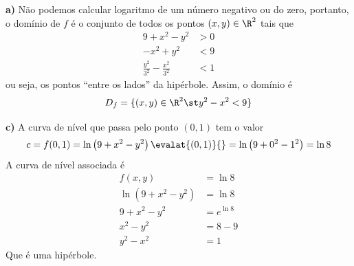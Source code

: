 \documentclass[a4paper,12pt,fleqn]{article}
\begin{document}
\begin{answer}
  \textbf{a)} \quad
  Não podemos calcular logaritmo de um número negativo ou do zero,
  portanto, o domínio de $f$ é o conjunto
  de todos os pontos \((x, y)\in\R^2\) tais que
  \begin{align*}
    9+x^2-y^2                         & > 0 \\
    -x^2 + y^2                        & < 9 \\
    \frac{y^2}{3^2} - \frac{x^2}{3^2} & < 1
  \end{align*}
  ou seja, os pontos ``entre os lados'' da hipérbole.
  Assim, o domínio é
  \[
  D_f = \{(x, y) \in \R^2 \st y^2 - x^2 < 9\}
  \]

  \bigskip
  \textbf{c)} \quad
  A curva de nível que passa pelo ponto $(0, 1)$ tem o valor
  \[
    c
    = f(0, 1)
    = \ln\left(9 +x^2 -y^2 \right) \evalat{(0, 1)}{}
    = \ln\left(9 +0^2 -1^2 \right)
    = \ln 8
  \]
  A curva de nível associada é
  \begin{align*}
    f(x, y)                   & = \ln 8     \\[2mm]
    \ln\left(9+x^2-y^2\right) & = \ln 8     \\[2mm]
    9 + x^2 - y^2             & = e^{\ln 8} \\[2mm]
    x^2 - y^2                 & = 8 - 9     \\[2mm]
    y^2 - x^2                 & = 1
  \end{align*}
  Que é uma hipérbole.
\end{answer}

\end{document}
